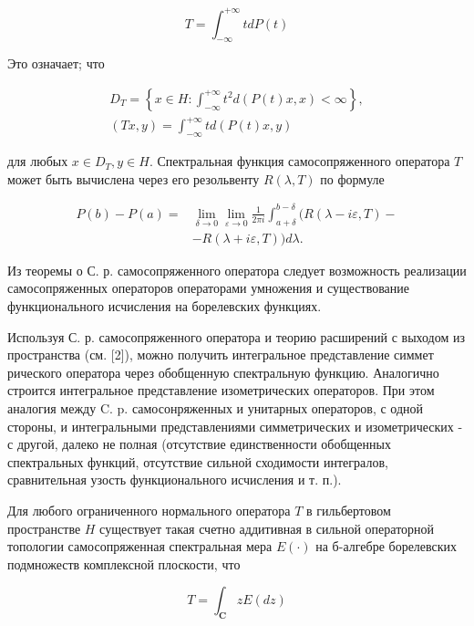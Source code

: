 \documentclass[10pt]{article}
\begin{document}
\[

T=\int_{-\infty}^{+\infty} t d P(t)

\]



Это означает; что



\[

\begin{gathered}

D_{T}=\left\{x \in H: \int_{-\infty}^{+\infty} t^{2} d(P(t) x, x)<\infty\right\}, \\

(T x, y)=\int_{-\infty}^{+\infty} t d(P(t) x, y)

\end{gathered}

\]



для любых $x \in D_{T}, y \in H$. Спектральная функция самосопряженного оператора $T$ может быть вычислена через его резольвенту $R(\lambda, T)$ по формуле



\[

\begin{aligned}

P(b)-P(a)= & \lim _{\delta \rightarrow 0} \lim _{\varepsilon \rightarrow 0} \frac{1}{2 \pi i} \int_{a+\delta}^{b-\delta}(R(\lambda-i \varepsilon, T)- \\

& -R(\lambda+i \varepsilon, T)) d \lambda .

\end{aligned}

\]



Из теоремы о С. р. самосопряженного оператора следует возможность реализации самосопряженных операторов операторами умножения и существование функционального исчисления на борелевских функциях.



Используя С. р. самосопряженного оператора и теорию расширений с выходом из пространства (см. [2]), можно получить интегральное представление симмет рического оператора через обобщенную спектральную функцию. Аналогично строится интегральное представление изометрических операторов. При этом аналогия между C. p. самосонряженных и унитарных операторов, с одной стороны, и интегральными представлениями симметрических и изометрических - с другой, далеко не полная (отсутствие единственности обобщенных спектральных функций, отсутствие сильной сходимости интегралов, сравнительная узость функционального исчисления и т. п.).



Для любого ограниченного нормального оператора $T$ в гильбертовом пространстве $H$ существует такая счетно аддитивная в сильной операторной топологии самосопряженная спектральная мера $E(\cdot)$ на б-алгебре борелевских подмножеств комплексной плоскости, что



\[

T=\int_{\mathbf{C}} z E(d z)

\]
\end{document}
